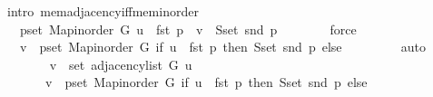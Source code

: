 \begin{isabellebody}
\ {\isacharparenleft}{\kern0pt}intro\ mem{\isacharunderscore}{\kern0pt}adjacency{\isacharunderscore}{\kern0pt}iff{\isacharunderscore}{\kern0pt}mem{\isacharunderscore}{\kern0pt}inorder{\isacharparenright}{\kern0pt}\isanewline
\ \ \ \ \isamarkupfalse%
\ \isamarkupfalse%
\ {\isachardoublequoteopen}{\isachardot}{\kern0pt}{\isachardot}{\kern0pt}{\isachardot}{\kern0pt}\ {\isasymlongleftrightarrow}\ {\isacharparenleft}{\kern0pt}{\isasymexists}p{\isasymin}set\ {\isacharparenleft}{\kern0pt}Map{\isacharunderscore}{\kern0pt}inorder\ G{\isacharparenright}{\kern0pt}{\isachardot}{\kern0pt}\ u\ {\isacharequal}{\kern0pt}\ fst\ p\ {\isasymand}\ v\ {\isasymin}\ S{\isachardot}{\kern0pt}set\ {\isacharparenleft}{\kern0pt}snd\ p{\isacharparenright}{\kern0pt}{\isacharparenright}{\kern0pt}{\isachardoublequoteclose}\isanewline
\ \ \ \ \ \ \isamarkupfalse%
\ force\isanewline
\ \ \ \ \isamarkupfalse%
\ \isamarkupfalse%
\ {\isachardoublequoteopen}{\isachardot}{\kern0pt}{\isachardot}{\kern0pt}{\isachardot}{\kern0pt}\ {\isasymlongleftrightarrow}\ v\ {\isasymin}\ {\isacharparenleft}{\kern0pt}{\isasymUnion}p{\isasymin}set\ {\isacharparenleft}{\kern0pt}Map{\isacharunderscore}{\kern0pt}inorder\ G{\isacharparenright}{\kern0pt}{\isachardot}{\kern0pt}\ if\ u\ {\isacharequal}{\kern0pt}\ fst\ p\ then\ S{\isachardot}{\kern0pt}set\ {\isacharparenleft}{\kern0pt}snd\ p{\isacharparenright}{\kern0pt}\ else\ {\isacharbraceleft}{\kern0pt}{\isacharbraceright}{\kern0pt}{\isacharparenright}{\kern0pt}{\isachardoublequoteclose}\isanewline
\ \ \ \ \ \ \isamarkupfalse%
\ auto\isanewline
\ \ \ \ \isamarkupfalse%
\ \isamarkupfalse%
\isanewline
\ \ \ \ \ \ {\isachardoublequoteopen}v\ {\isasymin}\ set\ {\isacharparenleft}{\kern0pt}adjacency{\isacharunderscore}{\kern0pt}list\ G\ u{\isacharparenright}{\kern0pt}\ {\isasymlongleftrightarrow}\isanewline
\ \ \ \ \ \ \ v\ {\isasymin}\ {\isacharparenleft}{\kern0pt}{\isasymUnion}p{\isasymin}set\ {\isacharparenleft}{\kern0pt}Map{\isacharunderscore}{\kern0pt}inorder\ G{\isacharparenright}{\kern0pt}{\isachardot}{\kern0pt}\ if\ u\ {\isacharequal}{\kern0pt}\ fst\ p\ then\ S{\isachardot}{\kern0pt}set\ {\isacharparenleft}{\kern0pt}snd\ p{\isacharparenright}{\kern0pt}\ else\ {\isacharbraceleft}{\kern0pt}{\isacharbraceright}{\kern0pt}{\isacharparenright}{\kern0pt}{\isachardoublequoteclose}\isanewline
\ \ \ \ \ \ \isacommand{{\isachardot}{\kern0pt}}\isamarkupfalse%
\ \isacommand{{\isacharbraceright}{\kern0pt}}\isamarkupfalse%
\isanewline
\ \ \isamarkupfalse%

\end{isabellebody}
